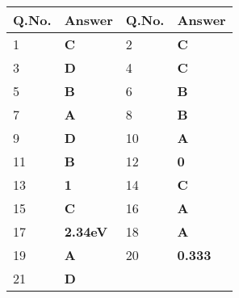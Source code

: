 \begin{enumerate}
\begin{table}[H]
\begin{tabular}{|p{1.5cm}|p{1.5cm}||p{1.5cm}|p{1.5cm}|}
		\rowcolor{ocrel}Q.No.&Answer&Q.No.&Answer\\\hline
		1&\textbf{C} &2&\textbf{C}\\\hline 
		3&\textbf{D} &4&\textbf{C} \\\hline
		5&\textbf{B} &6&\textbf{B} \\\hline
		7&\textbf{A}&8&\textbf{B}\\\hline
		9&\textbf{D}&10&\textbf{A}\\\hline
		11&\textbf{B} &12&\textbf{0}\\\hline
		13&\textbf{1}&14&\textbf{C}\\\hline
		15&\textbf{C}&16&\textbf{A} \\\hline
		17&\textbf{2.34eV}&18&\textbf{A}\\\hline
		19&\textbf{A}&20&\textbf{0.333}\\\hline
		21&\textbf{D}&&\textbf{}\\\hline
	\end{tabular}
\end{table}
	
	
	
	
	
	
	
	
	
	
	
	
	
	
	
	
	
	
	
\end{enumerate}